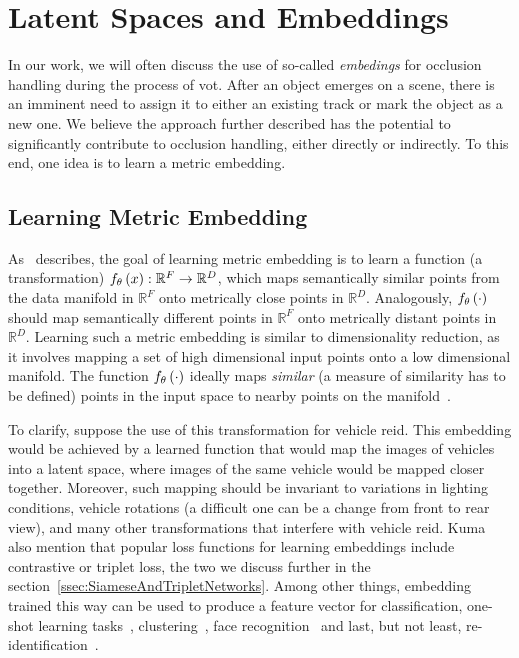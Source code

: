 \section{Latent Spaces and Embeddings}
\label{sec:LatentSpacesAndEmbeddings}

In our work, we will often discuss the use of so-called \emph{embedings} for occlusion handling during the process of \gls{vot}. After an object emerges on a scene, there is an imminent need to assign it to either an existing track or mark the object as a new one. We believe the approach further described has the potential to significantly contribute to occlusion handling, either directly or indirectly. To this end, one idea is to learn a metric embedding.

\subsection{Learning Metric Embedding}
\label{ssec:LearningMetricEmbedding}

As~\cite{hermans2017triplet} describes, the goal of learning metric embedding is to learn a function (a transformation) ${f_\theta} \left( x \right): \mathbb{R}^F \to \mathbb{R}^D$, which maps semantically similar points from the data manifold in $\mathbb{R}^F$ onto metrically close points in $\mathbb{R}^D$. Analogously, ${f_\theta} \left( \cdot \right)$ should map semantically different points in $\mathbb{R}^F$ onto metrically distant points in $\mathbb{R}^D$. Learning such a metric embedding is similar to dimensionality reduction, as it involves mapping a set of high dimensional input points onto a low dimensional manifold. The function ${f_\theta} \left( \cdot \right)$ ideally maps \emph{similar} (a measure of similarity has to be defined) points in the input space to nearby points on the manifold~\cite{hadsell2006dimreduction}.

To clarify, suppose the use of this transformation for vehicle \gls{reid}. This embedding would be achieved by a learned function that would map the images of vehicles into a latent space, where images of the same vehicle would be mapped closer together. Moreover, such mapping should be invariant to variations in lighting conditions, vehicle rotations (a difficult one can be a change from front to rear view), and many other transformations that interfere with vehicle \gls{reid}. Kuma~\etal{}~\cite{kuma2019vehiclereid} also mention that popular loss functions for learning embeddings include contrastive or triplet loss, the two we discuss further in the section~\ref{ssec:SiameseAndTripletNetworks}. Among other things, embedding trained this way can be used to produce a feature vector for classification, one-shot learning tasks~\cite{koch2015siameseoneshot}, clustering~\cite{schroff2015facenet}, face recognition~\cite{parkhi2015deepface} and last, but not least, re-identification~\cite{kuma2019vehiclereid}.

